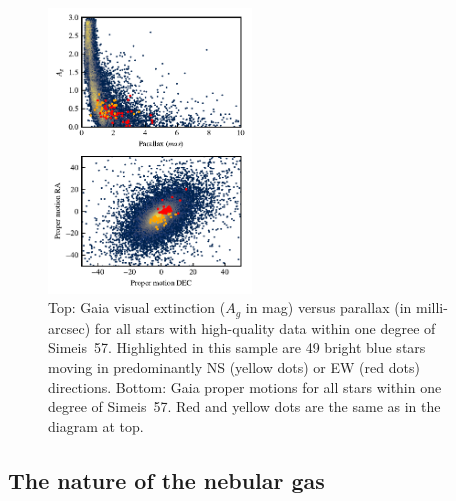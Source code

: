 \documentclass{aa}
\begin{document}

\begin{figure}
\includegraphics[width=0.48\textwidth]{GaiaResults.pdf}
\centering
\caption{Top: Gaia visual extinction ($A_g$ in mag) versus parallax
  (in milli-arcsec) for all stars with high-quality data within one
  degree of Simeis~57. Highlighted in this sample are 49 bright blue
  stars moving in predominantly NS (yellow dots) or EW (red dots)
  directions.  Bottom: Gaia proper motions for all stars within one
  degree of Simeis~57.  Red and yellow dots are the same as in the
  diagram at top.}
\label{fig:gaia_figs}
\end{figure}





\subsection{The nature of the nebular gas}
\end{document}
